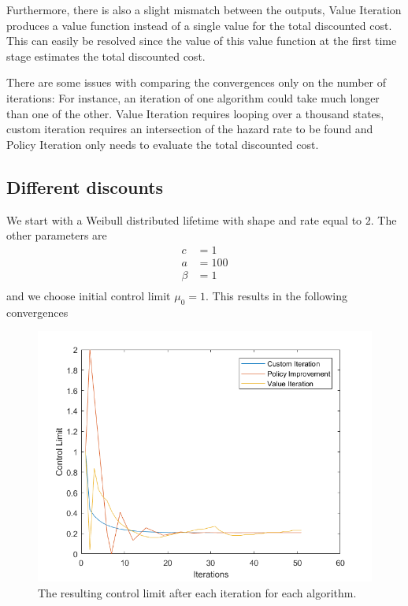 Furthermore, there is also a slight mismatch between the outputs, Value Iteration produces a value function instead of a single value for the total discounted cost.
This can easily be resolved since the value of this value function at the first time stage estimates the total discounted cost.

There are some issues with comparing the convergences only on the number of iterations:
For instance, an iteration of one algorithm could take much longer than one of the other.
Value Iteration requires looping over a thousand states, custom iteration requires an intersection of the hazard rate to be found and Policy Iteration only needs to evaluate the total discounted cost.
\subsection{Different discounts}
We start with a Weibull distributed lifetime with shape and rate equal to $2$.
The other parameters are
\begin{equation}
\begin{split}
c&=1\\
a&=100\\
\beta&=1\\
\end{split}
\end{equation}
and we choose initial control limit $\mu_0=1$.
This results in the following convergences
\begin{figure}[H]
\centering
\includegraphics[width=\textwidth]{Plots/CL Weibull2-2 Discount-1 Start-1.png}
\caption{The resulting control limit after each iteration for each algorithm.}
\end{figure}

